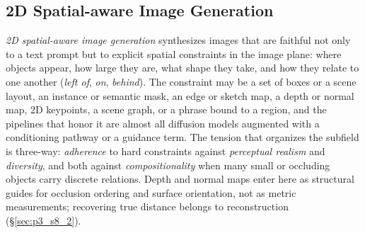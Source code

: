 \subsection{2D Spatial-aware Image Generation}
\label{subsec:p3_s8_1_2}
\emph{2D spatial-aware image generation} synthesizes images that are faithful not only to a text prompt but to explicit spatial constraints in the image plane: where objects appear, how large they are, what shape they take, and how they relate to one another (\emph{left of}, \emph{on}, \emph{behind}).
The constraint may be a set of boxes or a scene layout, an instance or semantic mask, an edge or sketch map, a depth or normal map, 2D keypoints, a scene graph, or a phrase bound to a region, and the pipelines that honor it are almost all diffusion models augmented with a conditioning pathway or a guidance term.
The tension that organizes the subfield is three-way: \emph{adherence} to hard constraints against \emph{perceptual realism} and \emph{diversity}, and both against \emph{compositionality} when many small or occluding objects carry discrete relations.
Depth and normal maps enter here as structural guides for occlusion ordering and surface orientation, not as metric measurements; recovering true distance belongs to reconstruction (§\ref{sec:p3_s8_2}).


